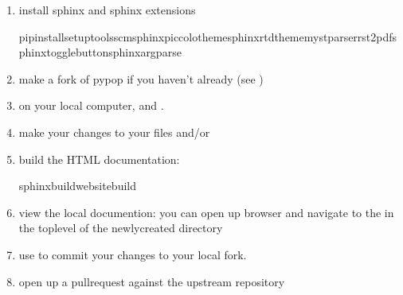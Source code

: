 \documentclass[letterpaper,10pt,english,openany,oneside]{sphinxmanual}
\begin{document}
\begin{enumerate}
%
\item {} 
\sphinxAtStartPar
install sphinx and sphinx extensions

\begin{sphinxVerbatim}[commandchars=\\\{\}]
pipinstallsetuptools\PYGZus{}scmsphinxpiccolo\PYGZhy{}themesphinx\PYGZus{}rtd\PYGZus{}thememyst\PYGZus{}parserrst2pdfsphinx\PYGZus{}togglebuttonsphinx\PYGZhy{}argparse
\end{sphinxVerbatim}

\item {} 
\sphinxAtStartPar
make a fork of pypop if you haven’t already (see {\hyperref[\detokenize{docs/guide-chapter-contributing:fork-this-repository}]{}})

\item {} 
\sphinxAtStartPar
{\hyperref[\detokenize{docs/guide-chapter-contributing:clone-the-main-repository}]{}} on your local computer, and {\hyperref[\detokenize{docs/guide-chapter-contributing:make-a-new-branch}]{}}.

\item {} 
\sphinxAtStartPar
make your changes to your  files and/or 

\item {} 
\sphinxAtStartPar
build the HTML documentation:

\begin{sphinxVerbatim}[commandchars=\\\{\}]
sphinx\PYGZhy{}buildwebsite\PYGZus{}build
\end{sphinxVerbatim}

\item {} 
\sphinxAtStartPar
view the local documention: you can open up browser and navigate to
the  in the top\sphinxhyphen{}level of the newly\sphinxhyphen{}created 
directory

\item {} 
\sphinxAtStartPar
use  to commit your changes to your local fork.

\item {} 
\sphinxAtStartPar
open up a pull\sphinxhyphen{}request against the upstream repository

\end{enumerate}
\end{document}

